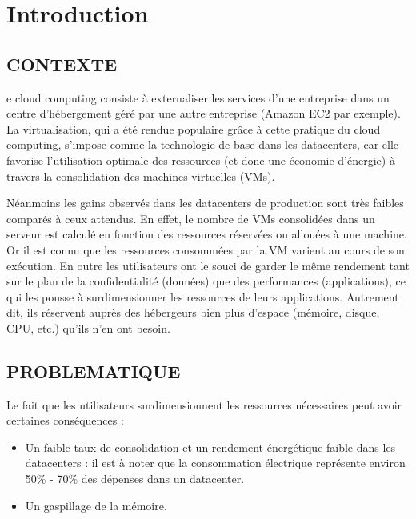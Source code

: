 %
%
\let\textcircled=\pgftextcircled
\chapter*{Introduction}
\label{chap:intro}
\section*{CONTEXTE}

e cloud computing consiste à externaliser les services d’une entreprise dans un centre d’hébergement géré par une autre entreprise (Amazon EC2 par exemple). La virtualisation, qui a été rendue populaire grâce à cette pratique du cloud computing, s'impose comme la technologie de base dans les datacenters, car elle favorise l'utilisation optimale des ressources (et donc une économie d'énergie) à travers la consolidation des machines virtuelles (VMs).
\par\noindent Néanmoins les gains observés dans les datacenters de production sont très faibles comparés à ceux attendus. En effet, le nombre de VMs consolidées dans un serveur est calculé en fonction des ressources réservées ou allouées à une machine. Or il est connu que les ressources consommées par la VM varient au cours de son exécution. En outre les utilisateurs ont le souci de garder le même rendement tant sur le plan de la confidentialité (données) que des performances (applications), ce qui les pousse à surdimensionner les ressources de leurs applications. Autrement dit, ils réservent auprès des hébergeurs bien plus d'espace (mémoire, disque, CPU, etc.) qu'ils n'en ont besoin.

\section*{PROBLEMATIQUE}

Le fait que les utilisateurs surdimensionnent les ressources nécessaires peut avoir certaines conséquences :

\begin{itemize}[label=, font=\large \color{darkorange}]
    \item Un faible taux de consolidation et un rendement énergétique faible dans les datacenters :  il est à noter que la consommation électrique représente environ 50\% - 70\% des dépenses dans un datacenter.
    \item Un gaspillage de la mémoire.
\end{itemize}


